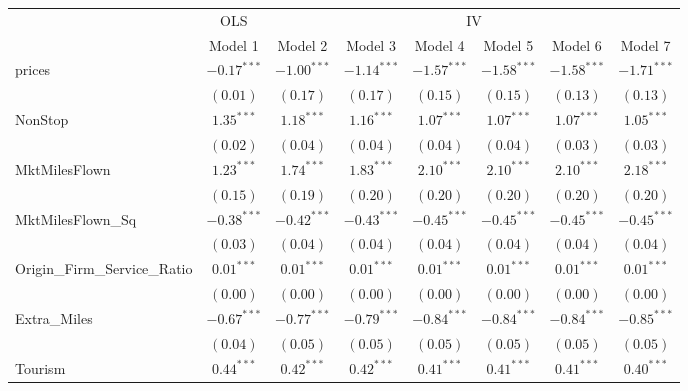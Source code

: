 
\begin{tabular}{l c c c c c c c}
\toprule
 & \multicolumn{1}{c}{OLS} & \multicolumn{6}{c}{IV} \\
\cmidrule(lr){2-2} \cmidrule(lr){3-8}
 & Model 1 & Model 2 & Model 3 & Model 4 & Model 5 & Model 6 & Model 7 \\
\midrule
prices                       & $-0.17^{***}$ & $-1.00^{***}$ & $-1.14^{***}$ & $-1.57^{***}$ & $-1.58^{***}$    & $-1.58^{***}$ & $-1.71^{***}$  \\
                             & $(0.01)$      & $(0.17)$      & $(0.17)$      & $(0.15)$      & $(0.15)$         & $(0.13)$      & $(0.13)$       \\
NonStop                      & $1.35^{***}$  & $1.18^{***}$  & $1.16^{***}$  & $1.07^{***}$  & $1.07^{***}$     & $1.07^{***}$  & $1.05^{***}$   \\
                             & $(0.02)$      & $(0.04)$      & $(0.04)$      & $(0.04)$      & $(0.04)$         & $(0.03)$      & $(0.03)$       \\
MktMilesFlown                & $1.23^{***}$  & $1.74^{***}$  & $1.83^{***}$  & $2.10^{***}$  & $2.10^{***}$     & $2.10^{***}$  & $2.18^{***}$   \\
                             & $(0.15)$      & $(0.19)$      & $(0.20)$      & $(0.20)$      & $(0.20)$         & $(0.20)$      & $(0.20)$       \\
MktMilesFlown\_Sq            & $-0.38^{***}$ & $-0.42^{***}$ & $-0.43^{***}$ & $-0.45^{***}$ & $-0.45^{***}$    & $-0.45^{***}$ & $-0.45^{***}$  \\
                             & $(0.03)$      & $(0.04)$      & $(0.04)$      & $(0.04)$      & $(0.04)$         & $(0.04)$      & $(0.04)$       \\
Origin\_Firm\_Service\_Ratio & $0.01^{***}$  & $0.01^{***}$  & $0.01^{***}$  & $0.01^{***}$  & $0.01^{***}$     & $0.01^{***}$  & $0.01^{***}$   \\
                             & $(0.00)$      & $(0.00)$      & $(0.00)$      & $(0.00)$      & $(0.00)$         & $(0.00)$      & $(0.00)$       \\
Extra\_Miles                 & $-0.67^{***}$ & $-0.77^{***}$ & $-0.79^{***}$ & $-0.84^{***}$ & $-0.84^{***}$    & $-0.84^{***}$ & $-0.85^{***}$  \\
                             & $(0.04)$      & $(0.05)$      & $(0.05)$      & $(0.05)$      & $(0.05)$         & $(0.05)$      & $(0.05)$       \\
Tourism                      & $0.44^{***}$  & $0.42^{***}$  & $0.42^{***}$  & $0.41^{***}$  & $0.41^{***}$     & $0.41^{***}$  & $0.40^{***}$   \\

\end{tabular}
